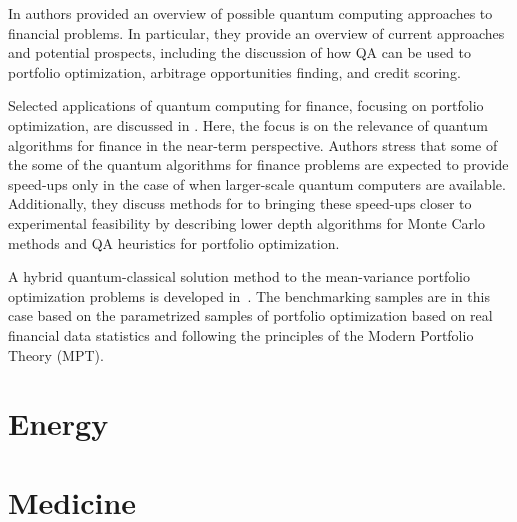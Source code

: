 \documentclass[a4paper,11pt]{article}
\begin{document}
In \cite{orus2019quantum} authors provided an overview of possible quantum computing approaches to financial problems. In particular, they provide an overview of current approaches and potential prospects, including the discussion of how QA can be used to portfolio optimization, arbitrage opportunities finding, and credit scoring.

Selected applications of quantum computing for finance, focusing on portfolio optimization, are discussed in \cite{bouland2020prospects}. Here, the focus is on  the relevance of quantum algorithms for finance in the near-term perspective. Authors stress that some of the some of the quantum algorithms for finance problems are expected to provide speed-ups only in the case of when larger-scale quantum computers are available. Additionally, they discuss methods for to bringing these speed-ups closer to experimental feasibility by describing lower depth algorithms for Monte Carlo methods and QA heuristics for portfolio optimization.

A hybrid quantum-classical solution method to the mean-variance portfolio optimization problems is developed in~\cite{venturelli2019reverse}. The benchmarking samples are in this case based on the parametrized samples of portfolio optimization based on real financial data statistics and following the principles of the Modern Portfolio Theory (MPT).


\cite{dri2022towards,dri2023more}

\newpage 

\section{Energy}

\cite{ajagekar2019quantum}

\newpage 

\section{Medicine}

\cite{floether2023state}

\newpage 
\end{document}
